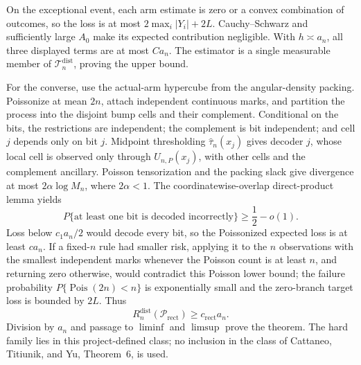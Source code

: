 On the exceptional event, each arm estimate is zero or a convex combination of outcomes, so the loss is at most \(2\max_i|Y_i|+2L\).  Cauchy--Schwarz and sufficiently large \(A_0\) make its expected contribution negligible.  With \(h\asymp a_n\), all three displayed terms are at most \(Ca_n\).  The estimator is a single measurable member of \(\mathcal T_n^{\mathrm{dist}}\), proving the upper bound.

For the converse, use the actual-arm hypercube from the angular-density packing.  Poissonize at mean \(2n\), attach independent continuous marks, and partition the process into the disjoint bump cells and their complement.  Conditional on the bits, the restrictions are independent; the complement is bit independent; and cell \(j\) depends only on bit \(j\).  Midpoint thresholding \(\widehat\tau_n(x_j)\) gives decoder \(j\), whose local cell is observed only through \(U_{n,P}(x_j)\), with other cells and the complement ancillary.  Poisson tensorization and the packing slack give divergence at most \(2\alpha\log M_n\), where \(2\alpha<1\).  The coordinatewise-overlap direct-product lemma yields
\[
 P\{\text{at least one bit is decoded incorrectly}\}\geq\frac12-o(1).
\]
Loss below \(c_1a_n/2\) would decode every bit, so the Poissonized expected loss is at least \(ca_n\).  If a fixed-\(n\) rule had smaller risk, applying it to the \(n\) observations with the smallest independent marks whenever the Poisson count is at least \(n\), and returning zero otherwise, would contradict this Poisson lower bound; the failure probability \(P\{\operatorname{Pois}(2n)<n\}\) is exponentially small and the zero-branch target loss is bounded by \(2L\).  Thus
\[
 R_n^{\mathrm{dist}}(\mathcal P_{\mathrm{rect}})\geq c_{\mathrm{rect}}a_n.
\]
Division by \(a_n\) and passage to \(\liminf\) and \(\limsup\) prove the theorem.  The hard family lies in this project-defined class; no inclusion in the class of Cattaneo, Titiunik, and Yu, Theorem~6, is used.